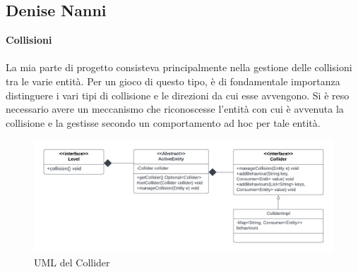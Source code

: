 \documentclass[a4paper,12pt]{report}
\begin{document}
\subsection{Denise Nanni}
\textbf{Collisioni}\\
\\
La mia parte di progetto consisteva principalmente nella gestione delle collisioni tra le varie entità.
Per un gioco di questo tipo, è di fondamentale importanza distinguere i vari tipi di collisione e le direzioni da cui esse avvengono. Si è reso necessario avere un meccanismo che riconoscesse l'entità con cui è avvenuta la collisione e la gestisse secondo un comportamento ad hoc per tale entità.

\begin{figure}[ht]
\includegraphics[width=1\textwidth]{umlCollider.png}
\caption{UML del Collider}
\label{fig:schgen}
\end{figure}
\end{document}

